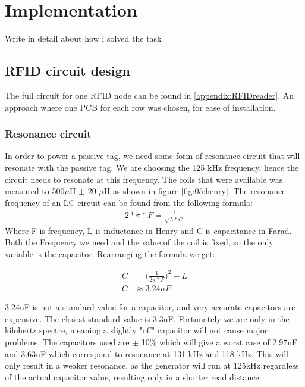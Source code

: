 \chapter{Implementation}
Write in detail about how i solved the task

\section{RFID circuit design}
The full circuit for one RFID node can be found in \ref{appendix:RFIDreader}. An approach where one PCB for each row was chosen, for ease of installation.
\subsection{Resonance circuit}

In order to power a passive tag, we need some form of resonance circuit that will resonate with the passive tag. We are choosing the 125 kHz frequency, hence the circuit needs to resonate at this frequency. The coils that were available was measured to 500$\mu$H $\pm$ 20 $\mu$H as shown in figure \ref{fig:05:henry}. The resonance frequency of an LC circuit can be found from the following formula:
\begin{align}
    2*\pi*F=\frac{1}{\sqrt{L*C}}
\end{align}
Where F is frequency, L is inductance in Henry and C is capacitance in Farad. Both the Frequency we need and the value of the coil is fixed, so the only variable is the capacitor. Rearranging the formula we get:

\begin{align}
    C&=\Big(\frac{1}{2\pi*F}\Big)^2-L\\
    C&\approx 3.24nF
\end{align}

3.24nF is not a standard value for a capacitor, and very accurate capacitors are expensive. The closest standard value is 3.3nF. Fortunately we are only in the kilohertz spectre, meaning a slightly "off" capacitor will not cause major problems. The capacitors used are $\pm$ 10\% which will give a worst case of 2.97nF and 3.63nF which correspond to resonance at 131 kHz and 118 kHz. This will only result in a weaker resonance, as the generator will run at 125kHz regardless of the actual capacitor value, resulting only in a shorter read distance.



